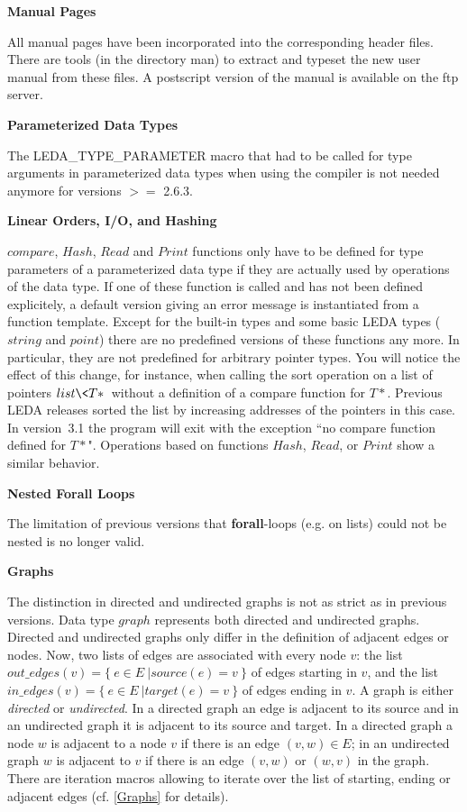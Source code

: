 \bigskip
{\bf Manual Pages}

  All manual pages have been incorporated into the corresponding
  header files. There are tools (in the directory man) to extract and
  typeset the new user manual from these files. A postscript
  version of the manual is available on the ftp server.


\bigskip
{\bf Parameterized Data Types}

  The  LEDA\_TYPE\_PARAMETER macro that had to be called for type
  arguments in parameterized data types when using the \gg compiler
  is not needed anymore for \gg versions $>=$ 2.6.3.


\bigskip
{\bf Linear Orders, I/O, and Hashing}

  $compare$, $Hash$, $Read$ and $Print$ functions only have to be 
  defined for type parameters of a parameterized data type if they are 
  actually used by operations of the data type. If one of these function 
  is called and has not been defined explicitely, a default version giving
  an error message is instantiated from a function template.
  Except for the built-in types and some basic LEDA types ($string$ and
  $point$) there are no predefined versions of these functions any more.
  In particular, they are not predefined for arbitrary pointer types. 
  You will notice the effect of this change, for instance, when calling 
  the sort operation on a list of pointers $list\<T*\>$ without a definition 
  of a compare function for $T*$.  Previous LEDA 
  releases sorted the list by increasing addresses of the pointers in 
  this case. In version~3.1 the program will exit with the exception
  ``no compare function defined for $T*$". Operations based on functions
  $Hash$, $Read$, or $Print$ show a similar behavior.

\bigskip
{\bf Nested Forall Loops }

   The limitation of previous versions that {\bf forall}-loops (e.g.
   on lists) could not be nested is no longer valid.



\bigskip
{\bf Graphs}

The distinction in directed and undirected graphs is not as strict as
in previous versions. Data type $graph$ represents both directed and
undirected graphs. Directed and undirected graphs only differ in the
definition of adjacent edges or nodes. Now, two lists of edges are 
associated with every node $v$: the list
$out\_edges(v) = \{\ e \in E\ | source(e) = v\ \}$ of edges starting in $v$,
and the list $in\_edges(v) = \{\ e \in E\ | target(e) = v\ \}$ of
edges ending in $v$. 
A graph is either {\em directed} or {\em undirected}.
In a directed graph an edge is adjacent to its source and in an undirected
graph it is adjacent to its source and target. In a directed graph a node $w$
is adjacent to a node $v$ if there is an edge $(v,w) \in E$; in an undirected
graph $w$ is adjacent to $v$ if there is an edge $(v,w)$ or $(w,v)$ in the
graph.  There are iteration macros allowing to iterate over the list of
starting, ending or adjacent edges (cf. \ref{Graphs} for details).


